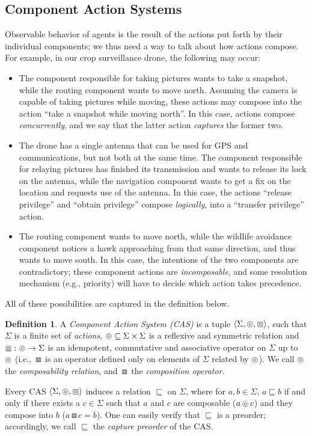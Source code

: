 \documentclass[a4paper]{article}
\newcommand{\angl}[1]{\left\langle#1\right\rangle}
\newcommand{\composable}{\mathop{\ocircle}\nolimits}
\newcommand{\compose}{\mathop{\boxbox}\nolimits}
\theoremstyle{definition}
\newtheorem{definition}{Definition}
\begin{document}
\subsection{Component Action Systems}
Observable behavior of agents is the result of the actions put forth by their individual components; we thus need a way to talk about how actions compose. For example, in our crop surveillance drone, the following may occur:
\begin{itemize}
    \item The component responsible for taking pictures wants to take a snapshot, while the routing component wants to move north. Assuming the camera is capable of taking pictures while moving, these actions may compose into the action ``take a snapshot while moving north''. In this case, actions compose \emph{concurrently}, and we say that the latter action \emph{captures} the former two. 
    \item The drone has a single antenna that can be used for GPS and communications, but not both at the same time. The component responsible for relaying pictures has finished its transmission and wants to release its lock on the antenna, while the navigation component wants to get a fix on the location and requests use of the antenna. In this case, the actions ``release privilege'' and ``obtain privilege'' compose \emph{logically}, into a ``transfer privilege'' action.
    \item The routing component wants to move north, while the wildlife avoidance component notices a hawk approaching from that same direction, and thus wants to move south. In this case, the intentions of the two components are contradictory; these component actions are \emph{incomposable}, and some resolution mechanism (e.g., priority) will have to decide which action takes precedence.
\end{itemize}
All of these possibilities are captured in the definition below.
\begin{definition}
A \emph{Component Action System (CAS)} is a tuple $\angl{\Sigma, \composable, \compose}$, such that $\Sigma$ is a finite set of \emph{actions}, $\composable \subseteq \Sigma \times \Sigma$ is a reflexive and symmetric relation and $\compose: \composable \to \Sigma$ is an idempotent, commutative and associative operator on $\Sigma$ up to $\composable$ (i.e., $\compose$ is an operator defined only on elements of $\Sigma$ related by $\composable$). We call $\composable$ the \emph{composability relation}, and $\compose$ the \emph{composition operator}.
\end{definition}
Every CAS $\angl{\Sigma, \composable, \compose}$ induces a relation $\sqsubseteq$ on $\Sigma$, where for $a, b \in \Sigma$, $a \sqsubseteq b$ if and only if there exists a $c \in \Sigma$ such that $a$ and $c$ are composable ($a \composable c$) and they compose into $b$ ($a \compose c = b$). One can easily verify that $\sqsubseteq$ is a preorder; accordingly, we call $\sqsubseteq$ the \emph{capture preorder} of the CAS\@.
\end{document}
